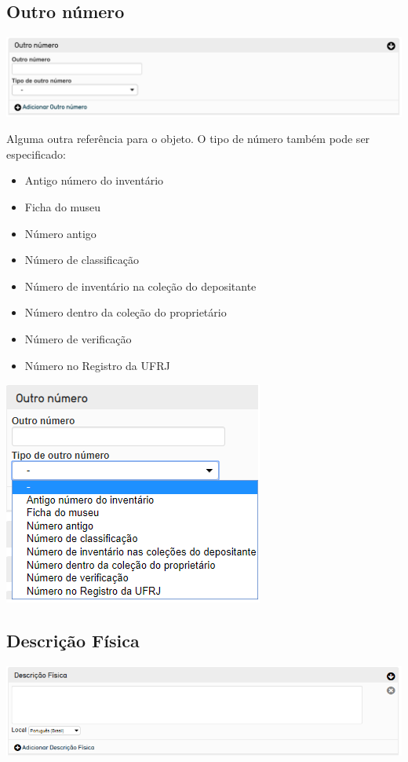 \subsection{Outro número}
\begin{flushleft}
	\includegraphics[width=\linewidth]{elemento-02}
\end{flushleft}
Alguma outra referência para o objeto. O tipo de número também pode ser especificado:
\begin{itemize}
	\item Antigo número do inventário
	\item Ficha do museu
	\item Número antigo
	\item Número de classificação
	\item Número de inventário na coleção do depositante
	\item Número dentro da coleção do proprietário
	\item Número de verificação
	\item Número no Registro da UFRJ
\end{itemize}
\begin{flushleft}
	\includegraphics[width=0.5\linewidth]{tipoOutroNumero}
\end{flushleft}

\subsection{Descrição Física}

\begin{flushleft}
	\includegraphics[width=\linewidth]{DescricFisica}
\end{flushleft}

